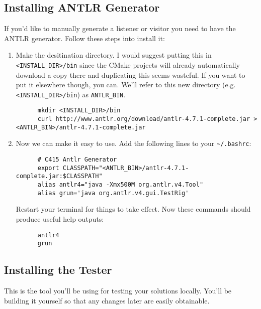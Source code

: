 \documentclass[../setup.tex]{subfiles}
\begin{document}
\subsection{Installing ANTLR Generator}
If you'd like to manually generate a listener or visitor you need to have the ANTLR generator.
Follow these steps into install it:
\begin{enumerate}
  \item
    Make the desitination directory. I would suggest putting this in \lstinline{<INSTALL_DIR>/bin}
    since the CMake projects will already automatically download a copy there and duplicating
    this seems wasteful. If you want to put it elsewhere though, you can. We'll refer to this new
    directory (e.g. \lstinline{<INSTALL_DIR>/bin}) as \lstinline{ANTLR_BIN}.
    \begin{lstlisting}
      mkdir <INSTALL_DIR>/bin
      curl http://www.antlr.org/download/antlr-4.7.1-complete.jar > <ANTLR_BIN>/antlr-4.7.1-complete.jar
    \end{lstlisting}
  \item
    Now we can make it easy to use. Add the following lines to your \lstinline{~/.bashrc}:
    \begin{lstlisting}
      # C415 Antlr Generator
      export CLASSPATH="<ANTLR_BIN>/antlr-4.7.1-complete.jar:$CLASSPATH"
      alias antlr4="java -Xmx500M org.antlr.v4.Tool"
      alias grun='java org.antlr.v4.gui.TestRig'
    \end{lstlisting}
    Restart your terminal for things to take effect. Now these commands should produce useful help
    outputs:
    \begin{lstlisting}
      antlr4
      grun
    \end{lstlisting}
\end{enumerate}

\subsection{Installing the Tester}
This is the tool you'll be using for testing your solutions locally. You'll be building it yourself
so that any changes later are easily obtainable.
\end{document}
